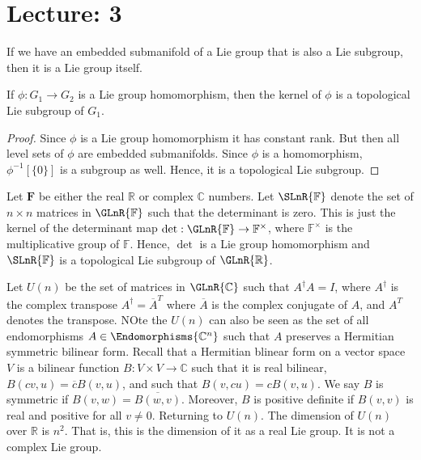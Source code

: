 \section{Lecture: 3}
    If we have an embedded submanifold of a Lie group that is also a
    Lie subgroup, then it is a Lie group itself.
    \begin{theorem}
        If $\phi:G_{1}\rightarrow{G}_{2}$ is a Lie group homomorphism,
        then the kernel of $\phi$ is a topological Lie subgroup of
        $G_{1}$.
    \end{theorem}
    \begin{proof}
        Since $\phi$ is a Lie group homomorphism it has constant rank.
        But then all level sets of $\phi$ are embedded submanifolds.
        Since $\phi$ is a homomorphism, $\phi^{\minus{1}}[\{0\}]$ is a
        subgroup as well. Hence, it is a topological Lie subgroup.
    \end{proof}
    \begin{example}
        Let $\mathbf{F}$ be either the real $\mathbb{R}$ or complex
        $\mathbb{C}$ numbers. Let $\SLnR{\mathbb{F}}$ denote the set of
        $n\times{n}$ matrices in $\GLnR{\mathbb{F}}$ such that the
        determinant is zero. This is just the kernel of the determinant
        map $\det:\GLnR{\mathbb{F}}\rightarrow\mathbb{F}^{\times}$,
        where $\mathbb{F}^{\times}$ is the multiplicative group of
        $\mathbb{F}$. Hence, $\det$ is a Lie group homomorphism and
        $\SLnR{\mathbb{F}}$ is a topological Lie subgroup of
        $\GLnR{\mathbb{R}}$.
    \end{example}
    \begin{example}
        Let $U(n)$ be the set of matrices in $\GLnR{\mathbb{C}}$ such
        that $A^{\dagger}A=I$, where $A^{\dagger}$ is the complex
        transpose $A^{\dagger}=\overline{A}^{T}$ where $\overline{A}$
        is the complex conjugate of $A$, and $A^{T}$ denotes the
        transpose. NOte the $U(n)$ can also be seen as the set of all
        endomorphisms $A\in\Endomorphisms{\mathbb{C}^{n}}$ such that $A$
        preserves a Hermitian symmetric bilinear form. Recall that a
        Hermitian blinear form on a vector space $V$ is a bilinear
        function $B:V\times{V}\rightarrow\mathbb{C}$ such that it is
        real bilinear, $B(cv,u)=\overline{c}B(v,u)$, and such that
        $B(v,cu)=cB(v,u)$. We say $B$ is symmetric if
        $B(v,w)=\overline{B(w,v)}$. Moreover, $B$ is positive definite
        if $B(v,v)$ is real and positive for all $v\ne{0}$. Returning to
        $U(n)$.
        The dimension of $U(n)$ over $\mathbb{R}$ is $n^{2}$. That is,
        this is the dimension of it as a real Lie group. It is not a
        complex Lie group.
    \end{example}

